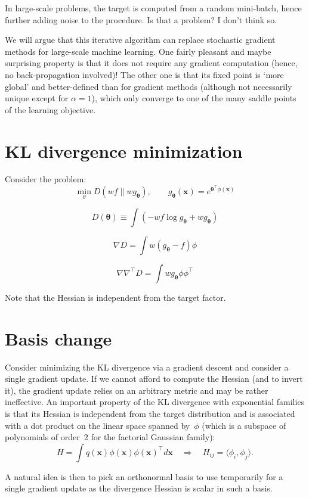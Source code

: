 \documentclass{article}
\def\x{\mathbf{x}}
\def\th{{\boldsymbol{\theta}}}
\begin{document}
In large-scale problems, the target is computed from a random mini-batch, hence further adding noise to the procedure. Is that a problem? I don't think so. 

We will argue that this iterative algorithm can replace stochastic gradient methods for large-scale machine learning. One fairly pleasant and maybe surprising property is that it does not require any gradient computation (hence, no back-propagation involved)! The other one is that its fixed point is `more global' and better-defined than for gradient methods (although not necessarily unique except for $\alpha=1$), which only converge to one of the many saddle points of the learning objective. 


\section{KL divergence minimization}

Consider the problem:
$$
\min_\theta D(wf \| wg_\th),
\qquad
g_\th(\x) = e^{\th^\top \phi(\x)}
$$

$$
D(\th) \equiv  \int (-wf \log g_\th + w g_\th) 
$$

$$
\nabla D = \int w(g_\th - f)\phi
$$

$$
\nabla\nabla^\top D = \int wg_\th \phi\phi^\top
$$

Note that the Hessian is independent from the target factor. 


\section{Basis change}

Consider minimizing the KL divergence via a gradient descent and consider a single gradient update. If we cannot afford to compute the Hessian (and to invert it), the gradient update relies on an arbitrary metric and may be rather ineffective. An important property of the KL divergence with exponential families is that its Hessian is independent from the target distribution and is associated with a dot product on the linear space spanned by~$\phi$ (which is a subspace of polynomials of order~2 for the factorial Gaussian family):
$$
H = \int q(\x) \phi(\x) \phi(\x)^\top d\x 
\quad \Rightarrow \quad
H_{ij} = \langle \phi_i , \phi_j \rangle .
$$

A natural idea is then to pick an orthonormal basis to use temporarily for a single gradient update as the divergence Hessian is scalar in such a basis. 
\end{document}
